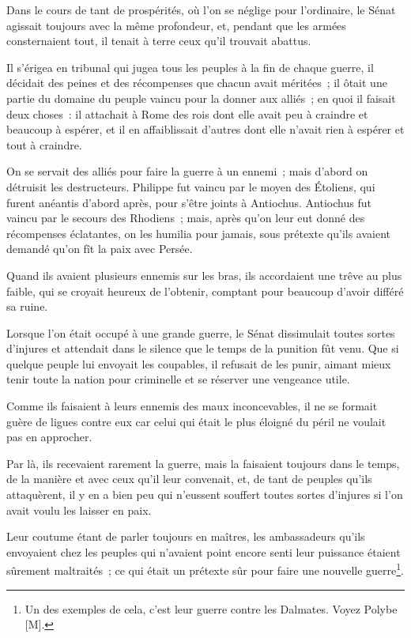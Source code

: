 \documentclass[french,twoside]{book} %
\newcommand\chaptercont{} %
\begin{document}
\chaptercont
\noindent Dans le cours de tant de prospérités, où l’on se néglige pour l’ordinaire, le Sénat agissait toujours avec la même profondeur, et, pendant que les armées consternaient tout, il tenait à terre ceux qu’il trouvait abattus.\par
Il s’érigea en tribunal qui jugea tous les peuples à la fin de chaque guerre, il décidait des peines et des récompenses que chacun avait méritées ; il ôtait une partie du domaine du peuple vaincu pour la donner aux alliés ; en quoi il faisait deux choses : il attachait à Rome des rois dont elle avait peu à craindre et beaucoup à espérer, et il en affaiblissait d’autres dont elle n’avait rien à espérer et tout à craindre.\par
On se servait des alliés pour faire la guerre à un ennemi ; mais d’abord on détruisit les destructeurs. Philippe fut vaincu par le moyen des Étoliens, qui furent anéantis d’abord après, pour s’être joints à Antiochus. Antiochus fut vaincu par le secours des Rhodiens ; mais, après qu’on leur eut donné des récompenses éclatantes, on les humilia pour jamais, sous prétexte qu’ils avaient demandé qu’on fît la paix avec Persée.\par
Quand ils avaient plusieurs ennemis sur les bras, ils accordaient une trêve au plus faible, qui se croyait heureux de l’obtenir, comptant pour beaucoup d’avoir différé sa ruine.\par
Lorsque l’on était occupé à une grande guerre, le Sénat dissimulait toutes sortes d’injures et attendait dans le silence que le temps de la punition fût venu. Que si quelque peuple lui envoyait les coupables, il refusait de les punir, aimant mieux tenir toute la nation pour criminelle et se réserver une vengeance utile.\par
Comme ils faisaient à leurs ennemis des maux inconcevables, il ne se formait guère de ligues contre eux car celui qui était le plus éloigné du péril ne voulait pas en approcher.\par
Par là, ils recevaient rarement la guerre, mais la faisaient toujours dans le temps, de la manière et avec ceux qu’il leur convenait, et, de tant de peuples qu’ils attaquèrent, il y en a bien peu qui n’eussent souffert toutes sortes d’injures si l’on avait voulu les laisser en paix.\par
Leur coutume étant de parler toujours en maîtres, les ambassadeurs qu’ils envoyaient chez les peuples qui n’avaient point encore senti leur puissance étaient sûrement maltraités ; ce qui était un prétexte sûr pour faire une nouvelle guerre\footnote{Un des exemples de cela, c’est leur guerre contre les Dalmates. Voyez Polybe [M].}.\par
\end{document}
